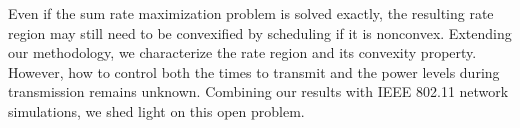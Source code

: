 \documentclass[10pt,twocolumn]{IEEEtran}
\newcommand{\0}{\mathbf{0}}
\newcommand{\1}{\mathbf{1}}
\begin{document}
Even if the sum rate maximization problem is solved exactly, the resulting rate region may still need to be convexified by scheduling if it is nonconvex. Extending our methodology, we characterize the rate region and its convexity property. However, how to control both the times to transmit and the power levels during transmission remains unknown. Combining our results with IEEE 802.11 network simulations, we shed light on this open problem. 

\end{document}
